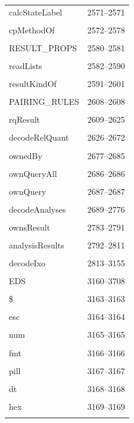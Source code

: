 {\begin{longtable}{@{}p{11cm}r@{}}
calcStateLabel & 2571--2571 \\\\\hline
cpMethodOf & 2572--2578 \\\\\hline
RESULT\_PROPS & 2580--2581 \\\\\hline
readLists & 2582--2590 \\\\\hline
resultKindOf & 2591--2601 \\\\\hline
PAIRING\_RULES & 2608--2608 \\\\\hline
rqResult & 2609--2625 \\\\\hline
decodeRelQuant & 2626--2672 \\\\\hline
ownedBy & 2677--2685 \\\\\hline
ownQueryAll & 2686--2686 \\\\\hline
ownQuery & 2687--2687 \\\\\hline
decodeAnalyses & 2689--2776 \\\\\hline
ownsResult & 2783--2791 \\\\\hline
analysisResults & 2792--2811 \\\\\hline
decodeIxo & 2813--3155 \\\\\hline
EDS & 3160--3708 \\\\\hline
\$ & 3163--3163 \\\\\hline
esc & 3164--3164 \\\\\hline
num & 3165--3165 \\\\\hline
fmt & 3166--3166 \\\\\hline
pill & 3167--3167 \\\\\hline
dt & 3168--3168 \\\\\hline
hex & 3169--3169 \\\\\hline

\end{longtable}}
